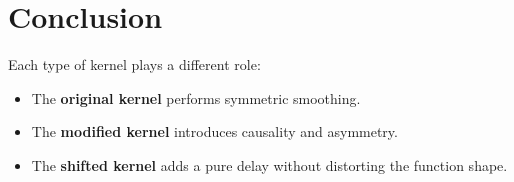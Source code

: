 \documentclass[12pt]{article}
\begin{document}
\section*{Conclusion}
Each type of kernel plays a different role:
\begin{itemize}
    \item The \textbf{original kernel} performs symmetric smoothing.
    \item The \textbf{modified kernel} introduces causality and asymmetry.
    \item The \textbf{shifted kernel} adds a pure delay without distorting the function shape.
\end{itemize}
\end{document}
